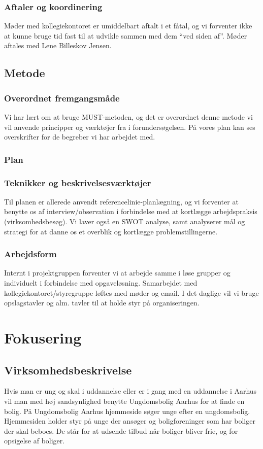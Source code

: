 \documentclass[12pt, a4paper]{report}
\begin{document}
\begin{itemize}
\subsubsection{Aftaler og koordinering}
Møder med kollegiekontoret er umiddelbart aftalt i et fåtal, og vi forventer ikke at kunne bruge tid fast til at udvikle sammen med dem “ved siden af”. Møder aftales med Lene Billeskov Jensen.

\subsection{Metode}
\subsubsection{Overordnet fremgangsmåde}
Vi har lært om at bruge MUST-metoden, og det er overordnet denne metode vi vil anvende principper og værktøjer fra i forundersøgelsen. På vores plan kan ses overskrifter for de begreber vi har arbejdet med.

\subsubsection{Plan}

\subsubsection{Teknikker og beskrivelsesværktøjer}
Til planen er allerede anvendt referencelinie-planlægning, og vi forventer at benytte os af interview/observation i forbindelse med at kortlægge arbejdspraksis (virksomhedsbesøg). Vi laver også en SWOT analyse, samt analyserer mål og strategi for at danne os et overblik og kortlægge problemstillingerne.

\subsubsection{Arbejdsform}
Internt i projektgruppen forventer vi at arbejde samme i løse grupper og individuelt i forbindelse med opgaveløsning. Samarbejdet med kollegiekontoret/styregruppe løftes med møder og email.
I det daglige vil vi bruge opslagstavler og alm. tavler til at holde styr på organiseringen.

\section{Fokusering}
 \subsection{Virksomhedsbeskrivelse}
Hvis man er ung og skal i uddannelse eller er i gang med en uddannelse i Aarhus vil man med høj sandsynlighed benytte Ungdomsbolig Aarhus for at finde en bolig. På Ungdomsbolig Aarhus hjemmeside søger unge efter en ungdomsbolig. Hjemmesiden holder styr på unge der ansøger og boligforeninger som har boliger der skal beboes. De står for at udsende tilbud når boliger bliver frie, og for opsigelse af boliger.

\end{itemize}
\end{document}

